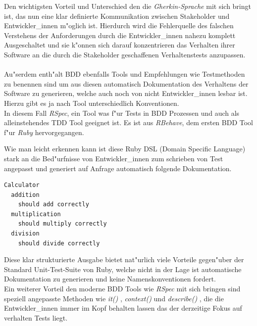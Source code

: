       Den wichtigsten Vorteil und Unterschied den die {\em Gherkin-Sprache} 
      mit sich bringt ist, das nun eine klar definierte Kommunikation zwischen 
      Stakeholder und Entwickler\_innen m"oglich ist. Hierdurch wird die 
      Fehlerquelle des falschen Verstehens der Anforderungen durch die 
      Entwickler\_innen nahezu komplett Ausgeschaltet und sie k"onnen sich darauf
      konzentrieren das Verhalten ihrer Software an die durch die Stakeholder
      geschaffenen Verhaltenstests anzupassen.\\\\

      Au"serdem enth"alt BDD ebenfalls Tools und Empfehlungen wie Testmethoden
      zu benennen sind um aus diesen automatisch Dokumentation des Verhaltens 
      der Software zu generieren, welche auch noch von nicht Entwickler\_innen
      lesbar ist. Hierzu gibt es ja nach Tool unterschiedlich Konventionen.\\
      In diesem Fall {\em RSpec}\cite{Rspec}, ein Tool was f"ur Tests in BDD 
      Prozessen und auch als alleinstehendes TDD Tool geeignet ist. Es ist aus 
      {\em RBehave}\cite{North:2007}, dem ersten BDD Tool f"ur {\em Ruby} hervorgegangen.
      
      Wie man leicht erkennen kann ist diese Ruby DSL (Domain Specific Language)
      stark an die Bed"urfnisse von Entwickler\_innen zum schrieben von Test
      angepasst und generiert auf Anfrage automatisch folgende Dokumentation.
      \begin{lstlisting}[caption=RSpec Documentation Ausgabe]
Calculator
  addition
    should add correctly
  multiplication
    should multiply correctly
  division
    should divide correctly
      \end{lstlisting}
      Diese klar strukturierte Ausgabe bietet nat"urlich viele Vorteile gegen"uber
      der Standard Unit-Test-Suite von Ruby, welche nicht in der Lage ist 
      automatische Dokumentation zu generieren und keine Namenskonventionen 
      fordert.\\
      Ein weiterer Vorteil den moderne BDD Tools wie {\em RSpec } mit sich bringen
      sind speziell angepasste Methoden wie {\em it() }, {\em context()} und 
      {\em describe() }, die die Entwickler\_innen immer im Kopf behalten lassen
      das der derzeitige Fokus auf verhalten Tests liegt.

